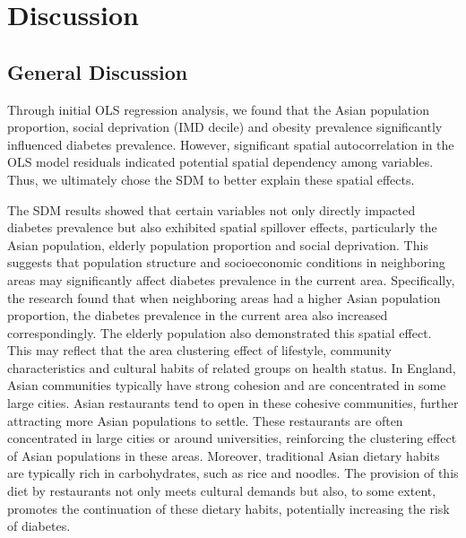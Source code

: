 \chapter{Discussion}
\label{chap:5}

\section{General Discussion}
\label{chap:5.1}
Through initial OLS regression analysis, we found that the Asian population proportion, social deprivation (IMD decile) and obesity prevalence significantly influenced diabetes prevalence. However, significant spatial autocorrelation in the OLS model residuals indicated potential spatial dependency among variables. Thus, we ultimately chose the SDM to better explain these spatial effects.

The SDM results showed that certain variables not only directly impacted diabetes prevalence but also exhibited spatial spillover effects, particularly the Asian population, elderly population proportion and social deprivation. This suggests that population structure and socioeconomic conditions in neighboring areas may significantly affect diabetes prevalence in the current area. Specifically, the research found that when neighboring areas had a higher Asian population proportion, the diabetes prevalence in the current area also increased correspondingly. The elderly population also demonstrated this spatial effect. This may reflect that the area clustering effect of lifestyle, community characteristics and cultural habits of related groups on health status. In England, Asian communities typically have strong cohesion and are concentrated in some large cities. Asian restaurants tend to open in these cohesive communities, further attracting more Asian populations to settle. These restaurants are often concentrated in large cities or around universities, reinforcing the clustering effect of Asian populations in these areas. Moreover, traditional Asian dietary habits are typically rich in carbohydrates, such as rice and noodles. The provision of this diet by restaurants not only meets cultural demands but also, to some extent, promotes the continuation of these dietary habits, potentially increasing the risk of diabetes.

